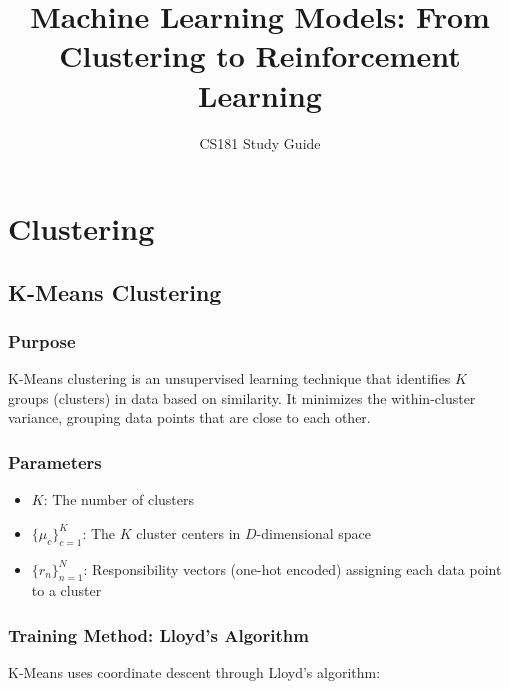\documentclass{article}
\title{Machine Learning Models: From Clustering to Reinforcement Learning}
\author{CS181 Study Guide}
\date{}
\begin{document}
\maketitle

\tableofcontents

\section{Clustering}

\subsection{K-Means Clustering}

\subsubsection{Purpose}
K-Means clustering is an unsupervised learning technique that identifies $K$ groups (clusters) in data based on similarity. It minimizes the within-cluster variance, grouping data points that are close to each other.

\subsubsection{Parameters}
\begin{itemize}
    \item $K$: The number of clusters
    \item $\{\mu_c\}_{c=1}^K$: The $K$ cluster centers in $D$-dimensional space
    \item $\{r_n\}_{n=1}^N$: Responsibility vectors (one-hot encoded) assigning each data point to a cluster
\end{itemize}

\subsubsection{Training Method: Lloyd's Algorithm}
K-Means uses coordinate descent through Lloyd's algorithm:
\end{document}

